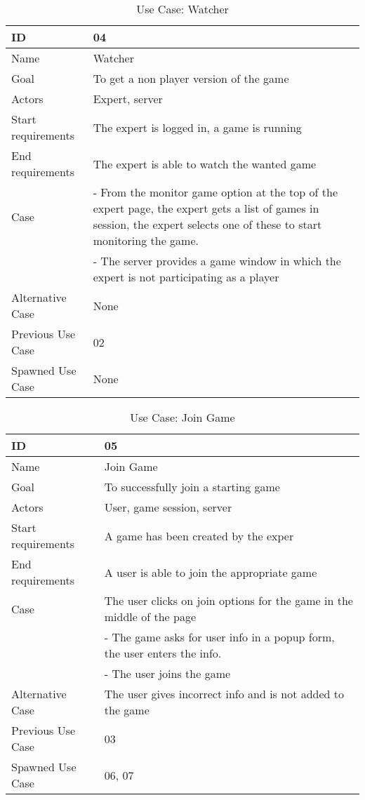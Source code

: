 \begin{table}[H]
\begin{tabular}{|l|l|}
\hline
	\textbf{ID} & \textbf{04}\\ \hline
	Name & Watcher\\ \hline
	Goal & To get a non player version of the game\\ \hline
	Actors & Expert, server\\ \hline
	Start requirements & The expert is logged in, a game is running \\ \hline
	End requirements & The expert is able to watch the wanted game\\ \hline
	Case &- From the monitor game option at the top of the expert page, the expert gets a list of games in session, the expert selects one of these to start monitoring the game.\\
		 &- The server provides a game window in which the expert is not participating as a player\\ \hline
	Alternative Case & None \\ \hline
	Previous Use Case & 02\\ \hline
	Spawned Use Case & None\\ \hline
\end{tabular}
\caption{Use Case: Watcher}
\label{fig:usecase04table}
\end{table}

\begin{table}[H]
\begin{tabular}{|l|l|}
\hline
	\textbf{ID} & \textbf{05}\\ \hline
	Name & Join Game\\ \hline
	Goal & To successfully join a starting game\\ \hline
	Actors & User, game session, server \\ \hline
	Start requirements & A game has been created by the exper\\ \hline
	End requirements & A user is able to join the appropriate game\\ \hline
	Case & The user clicks on join options for the game in the middle of the page\\
			&- The game asks for user info in a popup form, the user enters the info. \\
			&- The user joins the game \\ \hline
	Alternative Case & The user gives incorrect info and is not added to the game \\ \hline
	Previous Use Case & 03 \\ \hline
	Spawned Use Case & 06, 07\\ \hline
\end{tabular}
\caption{Use Case: Join Game}
\label{fig:usecase05table}
\end{table}



